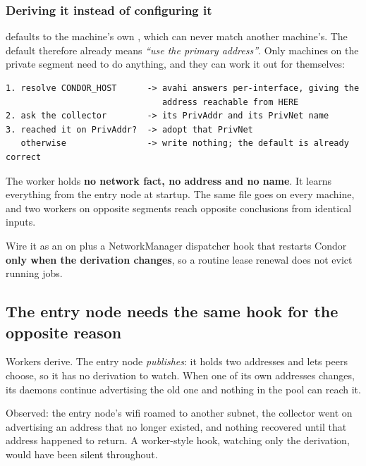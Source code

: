 \subsubsection{Deriving it instead of configuring it}

 defaults to the machine's own ,
which can never match another machine's. The default therefore already means
\emph{``use the primary address''}. Only machines on the private segment need to
do anything, and they can work it out for themselves:

\begin{lstlisting}[style=term]
1. resolve CONDOR_HOST      -> avahi answers per-interface, giving the
                               address reachable from HERE
2. ask the collector        -> its PrivAddr and its PrivNet name
3. reached it on PrivAddr?  -> adopt that PrivNet
   otherwise                -> write nothing; the default is already correct
\end{lstlisting}

\begin{keypoint}
The worker holds \textbf{no network fact, no address and no name}. It learns
everything from the entry node at startup. The same file goes on every machine,
and two workers on opposite segments reach opposite conclusions from identical
inputs.
\end{keypoint}

Wire it as an  on  plus a NetworkManager
dispatcher hook that restarts Condor \textbf{only when the derivation changes},
so a routine lease renewal does not evict running jobs.

\subsection{The entry node needs the same hook for the opposite reason}

Workers derive. The entry node \emph{publishes}: it holds two addresses and lets
peers choose, so it has no derivation to watch. When one of its own addresses
changes, its daemons continue advertising the old one and nothing in the pool can
reach it.

\begin{trap}
Observed: the entry node's wifi roamed to another subnet, the collector went on
advertising an address that no longer existed, and nothing recovered until that
address happened to return. A worker-style hook, watching only the derivation,
would have been silent throughout.
\end{trap}

